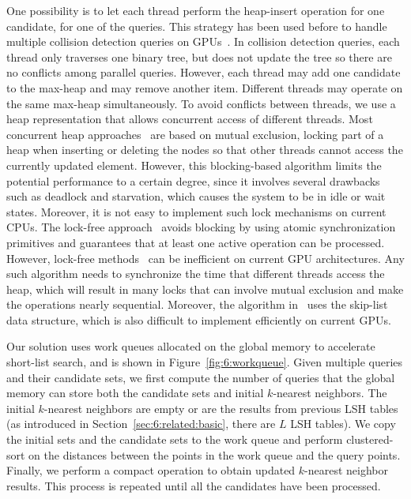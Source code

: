 One possibility is to let each thread perform the heap-insert operation for one candidate, for one of the queries. This strategy has been used before to handle multiple collision detection queries on GPUs~\cite{Lauterbach10}. In collision detection queries, each thread only traverses one binary tree, but does not update the tree so there are no conflicts among parallel queries. However, each thread may add one candidate to the max-heap and may remove another item. Different threads may operate on the same max-heap simultaneously. To avoid conflicts between threads, we use a heap representation that allows concurrent access of different threads. Most concurrent heap approaches~\cite{Rao:1988:CAP} are based on mutual exclusion, locking part of a heap when inserting or deleting the nodes so that other threads cannot access the currently updated element. However, this blocking-based algorithm limits the potential performance to a certain degree, since it involves several drawbacks such as deadlock and starvation, which causes the system to be in idle or wait states. Moreover, it is not easy to implement such lock mechanisms on current CPUs. The lock-free approach~\cite{Sundell:2005:FLC} avoids blocking by using atomic synchronization primitives and guarantees that at least one active operation can be processed. However, lock-free methods~\cite{Sundell:2005:FLC} can be inefficient on current GPU architectures. Any such algorithm needs to synchronize the time that different threads access the heap, which will result in many locks that can involve mutual exclusion and make the operations nearly sequential. Moreover, the algorithm in~\cite{Sundell:2005:FLC} uses the skip-list data structure, which is also difficult to implement efficiently on current GPUs.

Our solution uses work queues allocated on the global memory to accelerate short-list search, and is shown in Figure~\ref{fig:6:workqueue}.
Given multiple queries and their candidate sets, we first compute the number of queries
that the global memory can store both the candidate sets and initial $k$-nearest neighbors. The initial $k$-nearest neighbors are empty or are the results from previous LSH tables (as introduced in Section~\ref{sec:6:related:basic}, there are $L$ LSH tables). We copy the initial sets and the candidate sets to the work queue and perform clustered-sort on the distances between the points in the work queue and the query points. Finally, we perform a compact operation to obtain updated $k$-nearest neighbor results. This process is repeated until all the candidates have been processed.


